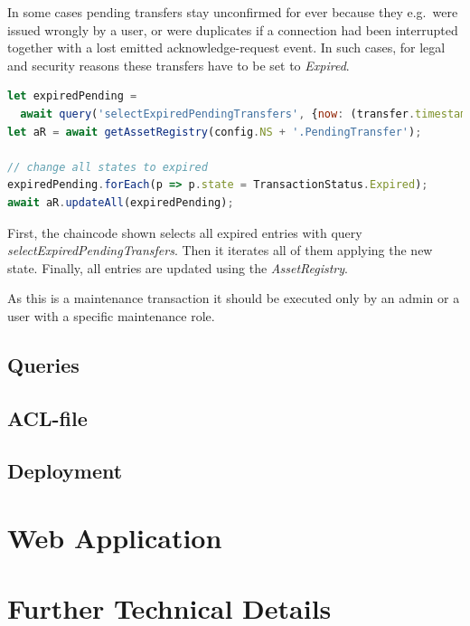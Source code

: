 In some cases pending transfers stay unconfirmed for ever because they e.g.\ were issued wrongly by a user, or were duplicates if a connection had been interrupted together with a lost emitted acknowledge-request event. In such cases, for legal and security reasons these transfers have to be set to \textit{Expired}.

\begin{center}
\begin{minipage}{0.8\textwidth}
\small
\begin{lstlisting}[language=javascript,firstnumber=1,caption={\bf\small clearDebt JavaScript excerpt}, captionpos=b,label=lst:js-cleanupPending]
let expiredPending =
  await query('selectExpiredPendingTransfers', {now: (transfer.timestamp)});
let aR = await getAssetRegistry(config.NS + '.PendingTransfer');

// change all states to expired
expiredPending.forEach(p => p.state = TransactionStatus.Expired);
await aR.updateAll(expiredPending);
\end{lstlisting}
\end{minipage}
\end{center}

First, the chaincode shown selects all expired entries with query \textit{selectExpiredPendingTransfers}. Then it iterates all of them applying the new state. Finally, all entries are updated using the \textit{AssetRegistry}.

As this is a maintenance transaction it should be executed only by an admin or a user with a specific maintenance role.

\subsection{Queries}
\label{subsec:queries}

\todo{}

\subsection{ACL-file}

\todo{}

\subsection{Deployment}

\todo{}


\section{Web Application}
\label{sec:webapp}


\section{Further Technical Details}
\label{sec:technical-details}

